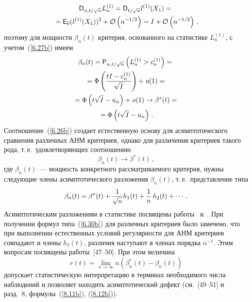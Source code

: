 \begin{multicols}{2}
\noindent
\begin{multline*}
{{\sf D}}_{n,t/\sqrt{n}}L_n^{(1)}= {{\sf D}}_{t/\sqrt{n}}l^{(1)}(X_1)={}\\
{}={{\sf E}}_0(l^{(1)}(X_1))^2+{\cal O}\left (n^{-1/2}\right )=
I + {\cal O}\left (n^{-1/2}\right )\,,
\end{multline*}
поэтому для мощности
$\beta_n(t)$ критерия, основанного на статистике $L_n^{(1)}$,  с
учетом~(\ref{6.27b}) имеем
\begin{multline*}
\beta_n(t)=
{{\sf P}}_{n,t/\sqrt{n}}\left ( L_n^{(1)}>c_n^{(1)}\right )={}\\
{}=
\Phi\left (\displaystyle\frac{\displaystyle tI-c_n^{(1)}\mathstrut}{\displaystyle \sqrt{I}\mathstrut}\right )+{\it o}(1)={}\\
{} = \Phi\left ( t\sqrt{I} - u_{\alpha}\right )+{\it o}(1)\to
\beta^*(t) ={}\\
{}= \Phi\left (t\sqrt{I} - u_{\alpha}\right )\,.
\end{multline*}
Соотношение~(\ref{6.26b}) создает
естественную основу для асимптотического сравнения различных АНМ
критериев, однако для различения критериев такого рода, т.\,е.\
удовлетворяющих соотношению
\begin{equation*}
\beta_n(t)\to \beta^*(t)\,,
\end{equation*}
где $\beta_n(t)$~---
мощность конкретного рассматриваемого критерия, нужны следующие
члены асимптотического разложения $\beta_n(t)$, т.\,е.\
представление типа
\begin{equation}
\beta_n(t) = \beta^*(t) + \displaystyle\frac{\displaystyle 1\mathstrut}{\displaystyle \sqrt{n}\mathstrut}h_1(t) + \displaystyle\frac{\displaystyle 1\mathstrut}{\displaystyle n\mathstrut}\,h_2(t)
+ \cdots\,. \label{6.30b}
\end{equation}
Асимптотическим разложениям в статистике
посвящены работы~\cite{26be} и~\cite{51be}.
При получении формул типа~(\ref{6.30b}) для
различных критериев было замечено, что при выполнении естественных
условий регулярности для АНМ критериев совпадают и члены $h_1(t)$,
различия наступают в членах порядка $n^{-1}$. Этим вопросам
посвящены работы~[47--50]. При этом величина
\begin{equation}
r(t) = \lim_{n\to\infty} n(\beta_n^*(t) - \beta_n(t))
\label{6.31b}
\end{equation}
допускает статистическую интерпретацию в терминах
необходимого числа наблюдений и позволяет находить асимптотический
дефект (см.~[49--51] и разд.~8, формулы~(\ref{8.11b}), (\ref{8.12b})).


\end{multicols}
